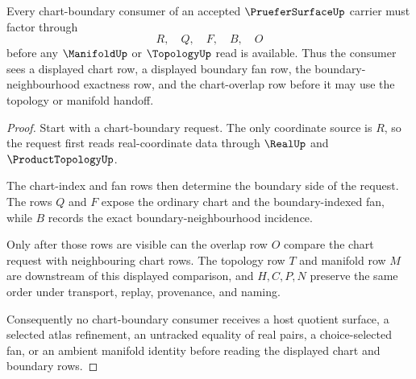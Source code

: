 \begin{theorem}
\label{thm:pruefer-surface-chart-boundary-route}
Every chart-boundary consumer of an accepted $\PrueferSurfaceUp$ carrier must factor through
$$
R,\quad Q,\quad F,\quad B,\quad O
$$
before any $\ManifoldUp$ or $\TopologyUp$ read is available. Thus the consumer sees a displayed chart row, a displayed boundary fan row, the boundary-neighbourhood exactness row, and the chart-overlap row before it may use the topology or manifold handoff.
\end{theorem}
\begin{proof}
Start with a chart-boundary request. The only coordinate source is $R$, so the request first reads real-coordinate data through $\RealUp$ and $\ProductTopologyUp$.

The chart-index and fan rows then determine the boundary side of the request. The rows $Q$ and $F$ expose the ordinary chart and the boundary-indexed fan, while $B$ records the exact boundary-neighbourhood incidence.

Only after those rows are visible can the overlap row $O$ compare the chart request with neighbouring chart rows. The topology row $T$ and manifold row $M$ are downstream of this displayed comparison, and $H,C,P,N$ preserve the same order under transport, replay, provenance, and naming.

Consequently no chart-boundary consumer receives a host quotient surface, a selected atlas refinement, an untracked equality of real pairs, a choice-selected fan, or an ambient manifold identity before reading the displayed chart and boundary rows.
\end{proof}




